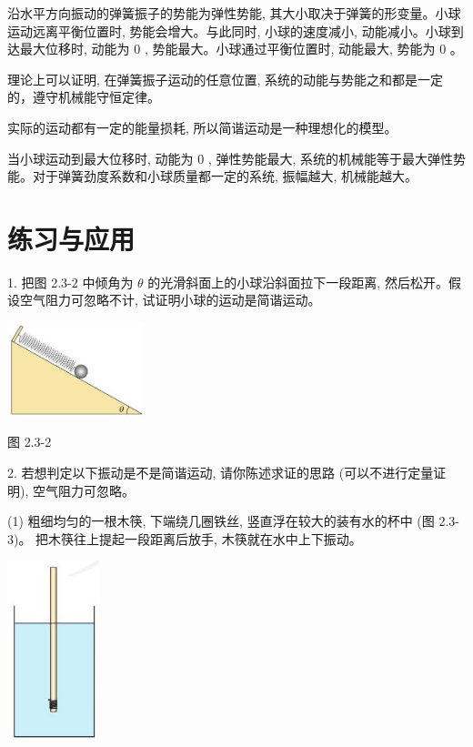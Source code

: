 \documentclass[10pt]{article}
\begin{document}
沿水平方向振动的弹簧振子的势能为弹性势能, 其大小取决于弹簧的形变量。小球运动远离平衡位置时, 势能会增大。与此同时, 小球的速度减小, 动能减小。小球到达最大位移时, 动能为 0 , 势能最大。小球通过平衡位置时, 动能最大, 势能为 0 。

理论上可以证明, 在弹簧振子运动的任意位置, 系统的动能与势能之和都是一定的，遵守机械能守恒定律。

实际的运动都有一定的能量损耗, 所以简谐运动是一种理想化的模型。

当小球运动到最大位移时, 动能为 0 , 弹性势能最大, 系统的机械能等于最大弹性势能。对于弹簧劲度系数和小球质量都一定的系统, 振幅越大, 机械能越大。

\section*{练习与应用}

1. 把图 2.3-2 中倾角为 \(\theta\) 的光滑斜面上的小球沿斜面拉下一段距离, 然后松开。假设空气阻力可忽略不计, 试证明小球的运动是简谐运动。

\begin{center}
\includegraphics[max width=0.3\textwidth]{images/01910e4c-ebb8-7d2c-8f2f-2375bc1d2d12_50_438666.jpg}
\end{center}

图 2.3-2

2. 若想判定以下振动是不是简谐运动, 请你陈述求证的思路 (可以不进行定量证明), 空气阻力可忽略。

(1) 粗细均匀的一根木筷, 下端绕几圈铁丝, 竖直浮在较大的装有水的杯中 (图 2.3-3)。 把木筷往上提起一段距离后放手, 木筷就在水中上下振动。

\begin{center}
\includegraphics[max width=0.2\textwidth]{images/01910e4c-ebb8-7d2c-8f2f-2375bc1d2d12_50_352216.jpg}
\end{center}
\end{document}

